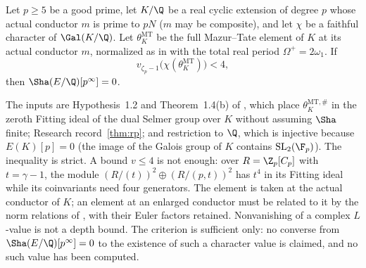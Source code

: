 \begin{researchrecord}\label{thm:depth}
Let $p\ge5$ be a good prime, let $K/\Q$ be a real cyclic extension of degree $p$ whose actual conductor $m$ is prime to $pN$ ($m$ may be composite), and let $\chi$ be a faithful character of $\Gal(K/\Q)$. Let $\theta_K^{\mathrm{MT}}$ be the full Mazur--Tate element of $K$ at its actual conductor $m$, normalized as in \cite[Def.~2.2]{bh} with the total real period $\Omega^+=2\omega_1$. If
\[
v_{\zeta_p-1}\bigl(\chi(\theta_K^{\mathrm{MT}})\bigr)<4,
\]
then $\Sha(E/\Q)[p^\infty]=0$.
\end{researchrecord}
The inputs are Hypothesis~1.2 and Theorem~1.4(b) of \cite{bh}, which place $\theta_K^{\mathrm{MT},\#}$ in the zeroth Fitting ideal of the dual Selmer group over $K$ without assuming $\Sha$ finite; Research record~\ref{thm:rp}; and restriction to $\Q$, which is injective because $E(K)[p]=0$ (the image of the Galois group of $K$ contains $\mathrm{SL}_2(\F_p)$). The inequality is strict. A bound $v\le4$ is not enough: over $R=\Z_p[C_p]$ with $t=\gamma-1$, the module $(R/(t))^2\oplus(R/(p,t))^2$ has $t^4$ in its Fitting ideal while its coinvariants need four generators. The element is taken at the actual conductor of $K$; an element at an enlarged conductor must be related to it by the norm relations of \cite[Prop.~2.4]{bh}, with their Euler factors retained. Nonvanishing of a complex $L$-value is not a depth bound. The criterion is sufficient only: no converse from $\Sha(E/\Q)[p^\infty]=0$ to the existence of such a character value is claimed, and no such value has been computed.
